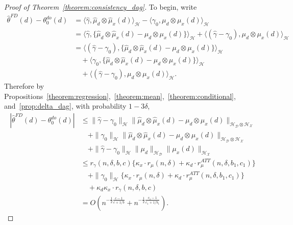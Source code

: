 \begin{proof}[Proof of Theorem~\ref{theorem:consistency_dag}]
To begin, write
\begin{align*}
        \hat{\theta}^{FD}(d)-\theta_0^{do}(d)
        &=\langle \hat{\gamma} , \hat{\mu}_d\otimes \hat{\mu}_x(d) \rangle_{\mathcal{H}} - \langle \gamma_0 , \mu_d\otimes \mu_x(d) \rangle_{\mathcal{H}} \\
        &=\langle \hat{\gamma} , \{\hat{\mu}_d\otimes \hat{\mu}_x(d)-\mu_d\otimes \mu_x(d)\} \rangle_{\mathcal{H}} + \langle (\hat{\gamma}-\gamma_0), \mu_d\otimes \mu_x(d) \rangle_{\mathcal{H}} \\
        &=\langle (\hat{\gamma}-\gamma_0), \{\hat{\mu}_d\otimes \hat{\mu}_x(d)-\mu_d\otimes \mu_x(d)\}\rangle_{\mathcal{H}} \\
        &\quad + \langle \gamma_0, \{\hat{\mu}_d\otimes \hat{\mu}_x(d)-\mu_d\otimes \mu_x(d)\} \rangle_{\mathcal{H}}\\
        &\quad +\langle (\hat{\gamma}-\gamma_0), \mu_d\otimes \mu_x(d) \rangle_{\mathcal{H}}.
    \end{align*}
    Therefore by Propositions~\ref{theorem:regression},~\ref{theorem:mean},~\ref{theorem:conditional}, and~\ref{prop:delta_dag}, with probability $1-3\delta$,
  \begin{align*}
      |\hat{\theta}^{FD}(d)-\theta_0^{do}(d)|
      &\leq 
      \|\hat{\gamma}-\gamma_0\|_{\mathcal{H}}\|\hat{\mu}_d\otimes \hat{\mu}_x(d)-\mu_d\otimes \mu_x(d)\|_{\mathcal{H}_{\mathcal{D}}\otimes \mathcal{H}_{\mathcal{X}}}\\
      &\quad +
      \|\gamma_0\|_{\mathcal{H}}\|\hat{\mu}_d\otimes \hat{\mu}_x(d)-\mu_d\otimes \mu_x(d)\|_{\mathcal{H}_{\mathcal{D}}\otimes \mathcal{H}_{\mathcal{X}}} \\
      &\quad +
      \|\hat{\gamma}-\gamma_0\|_{\mathcal{H}}\|\mu_d\|_{\mathcal{H}_{\mathcal{D}}} \|\mu_x(d)\|_{\mathcal{H}_{\mathcal{X}}}
      \\
      &\leq r_{\gamma}(n,\delta,b,c)\{\kappa_x \cdot r_{\mu} (n,\delta)+\kappa_d\cdot   r^{ATT}_{\mu}(n,\delta,b_1,c_1)\} \\
      &\quad +\|\gamma_0\|_{\mathcal{H}}\{\kappa_x \cdot r_{\mu} (n,\delta)+\kappa_d\cdot   r^{ATT}_{\mu}(n,\delta,b_1,c_1)\}\\
      &\quad +\kappa_d\kappa_x\cdot r_{\gamma}(n,\delta,b,c) \\
      &=O\left(n^{-\frac{1}{2}\frac{c-1}{c+1/b}}+n^{-\frac{1}{2}\frac{c_1-1}{c_1+1/b_1}}\right).
  \end{align*}

\end{proof}
